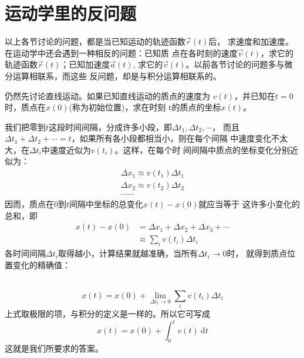 \section{运动学里的反问题}\label{sec:01.11}

以上各节讨论的问题，都是当已知运动的轨迹函数$\vec{r}\left(t\right)$后，
求速度和加速度。在运动学中还会遇到一种相反的问题：已知质
点在各时刻的速度$\vec{v}\left(t\right)$，求它的轨迹函数$\vec{r}\left(t\right)$；已知加速度$\vec{a}\left(t\right)$,
求它的$\vec{v}\left(t\right)$。以前各节讨论的问题多与微分运算相联系，而这些
反问题，却是与积分运算相联系的。

仍然先讨论直线运动。如果已知直线运动的质点的速度为
$v\left(t\right)$，并已知在$t=0$时，质点在$x\left(0\right)$(称为初始位置)，求在时刻
t的质点的坐标$x\left(t\right)$。

我们把零到$t$这段时间间隔，分成许多小段，即$\Delta t_1 , \Delta t_2 , \cdots$，
而且$\Delta t_1+\Delta t_2+\cdots=t$，如果所有各小段都相当小，则在每个间隔
中速度变化不太大，在$\Delta t_i$中速度近似为$v\left(t_i\right)$。这样，在每个时
间间隔中质点的坐标变化分别近似为：
\begin{equation*}
  \begin{array}{l}
    \Delta x_{1} \approx v\left(t_{1}\right) \Delta t_{1} \\[-1pt]
    \Delta x_{2} \approx v\left(t_{2}\right) \Delta t_{2} \\[-1pt]
    \cdots \cdots
  \end{array}
\end{equation*}
因而，质点在0到$t$间隔中坐标的总变化$x\left(t\right)-x\left(0\right)$就应当等于
这许多小变化的总和，即\vspace{-0.5em}
\begin{equation}\label{eqn:01.11.01}
  \begin{aligned}
    x\left(t\right)-x\left(0\right) & =\Delta x_{1}+\Delta x_{2}+\Delta x_{3}+\cdots    \\[-1pt]
                                    & \approx \sum_{i} v\left(t_{i}\right) \Delta t_{i}
  \end{aligned}
\end{equation}
各时间间隔$\Delta t_i$取得越小，计算结果就越准确，当所有$\Delta t_i\rightarrow 0$时，
就得到质点位置变化的精确值：

~\vspace{-1.56em}
\begin{equation}\label{eqn:01.11.02}
  x\left(t\right)=x\left(0\right)+\lim _{\Delta t_{i} \rightarrow 0} \sum_{i} v\left(t_{i}\right) \Delta t_{i}
\end{equation}
上式取极限的项，与积分的定义是一样的。所以它可写成
\begin{equation}\label{eqn:01.11.03}
  x\left(t\right)=x\left(0\right)+\int_{0}^{t} v\left(t\right) {~\mathrm d} t
\end{equation}
这就是我们所要求的答案。

